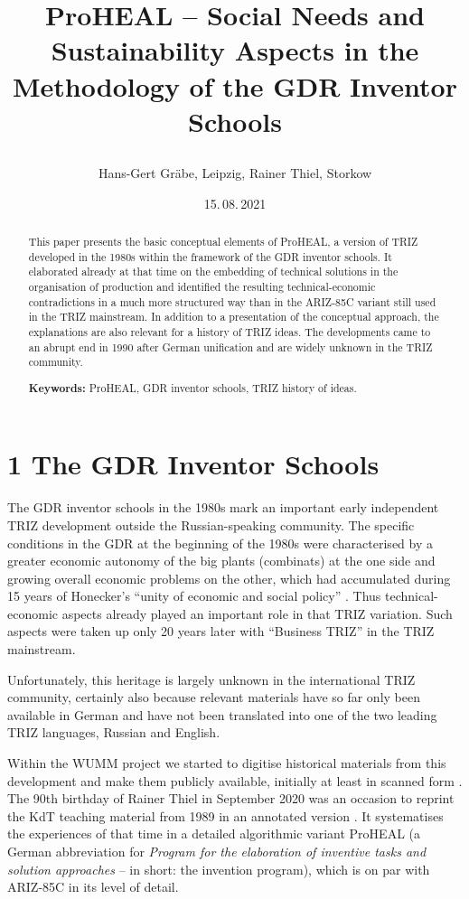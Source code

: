 \documentclass[12pt,a4paper]{article}
\title{\raggedright ProHEAL – Social Needs and Sustainability Aspects in the
  Methodology of 
  the GDR Inventor Schools}
\author{Hans-Gert Gräbe, Leipzig, Rainer Thiel, Storkow}
\date{15.\,08.\,2021}
\begin{document}
\maketitle

\begin{abstract}
  This paper presents the basic conceptual elements of ProHEAL, a version of
  TRIZ developed in the 1980s within the framework of the GDR inventor
  schools. It elaborated already at that time on the embedding of technical
  solutions in the organisation of production and identified the resulting
  technical-economic contradictions in a much more structured way than in the
  ARIZ-85C variant still used in the TRIZ mainstream. In addition to a
  presentation of the conceptual approach, the explanations are also relevant
  for a history of TRIZ ideas. The developments came to an abrupt end in 1990
  after German unification and are widely unknown in the TRIZ community.
  \bigskip
  
  \textbf{Keywords:} ProHEAL, GDR inventor schools, TRIZ history of ideas.
\end{abstract}

\section*{1 The GDR Inventor Schools}

The GDR inventor schools in the 1980s mark an important early independent TRIZ
development outside the Russian-speaking community. The specific conditions in
the GDR at the beginning of the 1980s were characterised by a greater economic
autonomy of the big plants (combinats) at the one side and growing overall
economic problems on the other, which had accumulated during 15 years of
Honecker's “unity of economic and social policy” \cite{6,7}. Thus
technical-economic aspects already played an important role in that TRIZ
variation. Such aspects were taken up only 20 years later with “Business TRIZ”
in the TRIZ mainstream.

Unfortunately, this heritage is largely unknown in the international TRIZ
community, certainly also because relevant materials \cite{13,14} have so far
only been available in German and have not been translated into one of the two
leading TRIZ languages, Russian and English.

Within the WUMM project \cite{16} we started to digitise historical materials
from this development and make them publicly available, initially at least in
scanned form \cite{17}. The 90th birthday of Rainer Thiel in September 2020
was an occasion to reprint the KdT teaching material \cite{13} from 1989 in an
annotated version \cite{15}. It systematises the experiences of that time in a
detailed algorithmic variant ProHEAL (a German abbreviation for \emph{Program
  for the elaboration of inventive tasks and solution approaches} – in short:
the invention program), which is on par with ARIZ-85C in its level of detail.
\end{document}
